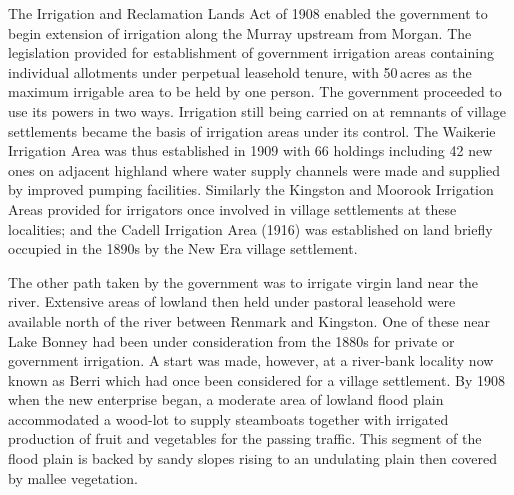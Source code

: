 
The Irrigation and Reclamation Lands Act of 1908
 enabled
the government to begin extension of irrigation along the Murray
upstream from Morgan.   The legislation provided for
establishment of government irrigation areas containing individual
allotments under perpetual leasehold tenure, with 50\,acres as the
maximum irrigable area to be held by one person.  The government
proceeded to use its powers in two ways.  Irrigation still being
carried on at remnants of village settlements became the basis of
irrigation areas under its control.  The Waikerie Irrigation Area
 was thus established in 1909 with 66
holdings including 42 new ones on adjacent highland where water supply
channels were made and supplied
by improved pumping facilities.
Similarly the King\-ston and
Moorook Irrigation Areas provided for
irrigators once involved in village settlements at these localities;
and the Cadell Irrigation Area (1916)
was established on land briefly occupied in the 1890s by the New Era
village settlement.


The other path taken by the government was to irrigate virgin land
near the river.  Extensive areas of lowland then held under pastoral
leasehold were available north of the river between Renmark and
King\-ston.  One of these near Lake Bonney  had
been under consideration from the 1880s for private or government
irrigation.  A start was made, however, at a river-bank locality now
known as Berri  which had once been considered for a
village settlement.  By 1908 when the new enterprise began, a moderate
area of lowland flood plain accommodated a wood-lot to supply
steamboats together with irrigated production of
fruit and vegetables for the passing
traffic.  This segment of the flood plain is backed
by sandy slopes rising to an undulating plain then covered by mallee
vegetation.


